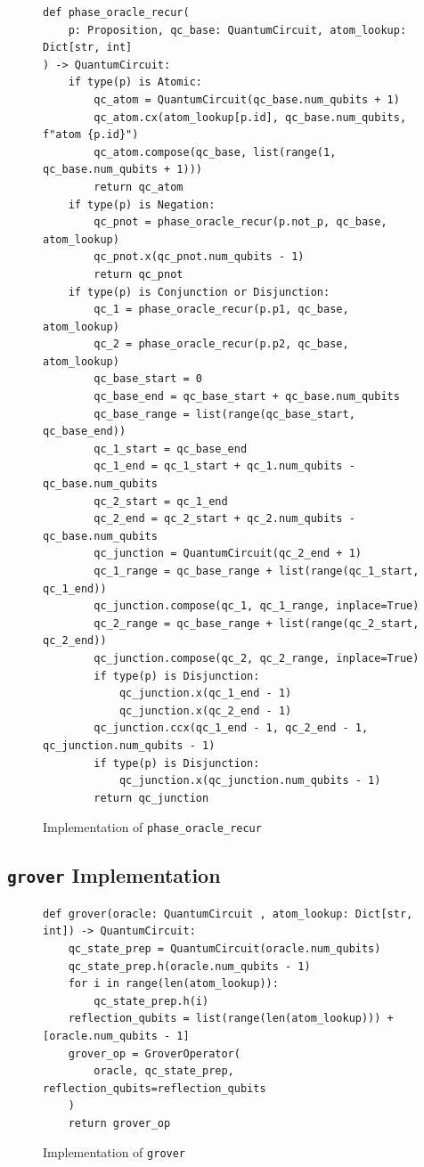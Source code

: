 \begin{figure}[H]
\centering
\begin{verbatim}
def phase_oracle_recur(
    p: Proposition, qc_base: QuantumCircuit, atom_lookup: Dict[str, int]
) -> QuantumCircuit:
    if type(p) is Atomic:
        qc_atom = QuantumCircuit(qc_base.num_qubits + 1)
        qc_atom.cx(atom_lookup[p.id], qc_base.num_qubits, f"atom {p.id}")
        qc_atom.compose(qc_base, list(range(1, qc_base.num_qubits + 1)))
        return qc_atom
    if type(p) is Negation:
        qc_pnot = phase_oracle_recur(p.not_p, qc_base, atom_lookup)
        qc_pnot.x(qc_pnot.num_qubits - 1)
        return qc_pnot
    if type(p) is Conjunction or Disjunction:
        qc_1 = phase_oracle_recur(p.p1, qc_base, atom_lookup)
        qc_2 = phase_oracle_recur(p.p2, qc_base, atom_lookup)
        qc_base_start = 0
        qc_base_end = qc_base_start + qc_base.num_qubits
        qc_base_range = list(range(qc_base_start, qc_base_end))
        qc_1_start = qc_base_end
        qc_1_end = qc_1_start + qc_1.num_qubits - qc_base.num_qubits
        qc_2_start = qc_1_end
        qc_2_end = qc_2_start + qc_2.num_qubits - qc_base.num_qubits
        qc_junction = QuantumCircuit(qc_2_end + 1)
        qc_1_range = qc_base_range + list(range(qc_1_start, qc_1_end))
        qc_junction.compose(qc_1, qc_1_range, inplace=True)
        qc_2_range = qc_base_range + list(range(qc_2_start, qc_2_end))
        qc_junction.compose(qc_2, qc_2_range, inplace=True)
        if type(p) is Disjunction:
            qc_junction.x(qc_1_end - 1)
            qc_junction.x(qc_2_end - 1)
        qc_junction.ccx(qc_1_end - 1, qc_2_end - 1, qc_junction.num_qubits - 1)
        if type(p) is Disjunction:
            qc_junction.x(qc_junction.num_qubits - 1)
        return qc_junction
\end{verbatim}
\caption{Implementation of \texttt{phase\_oracle\_recur} }
\label{fig:phase_oracle_recur}
\end{figure}

\subsection{\texttt{grover} Implementation}\label{subsec:grover-implementation}

\begin{figure}

\end{figure}

\begin{figure}
\centering
\begin{verbatim}
def grover(oracle: QuantumCircuit , atom_lookup: Dict[str, int]) -> QuantumCircuit:
    qc_state_prep = QuantumCircuit(oracle.num_qubits)
    qc_state_prep.h(oracle.num_qubits - 1)
    for i in range(len(atom_lookup)):
        qc_state_prep.h(i)
    reflection_qubits = list(range(len(atom_lookup))) + [oracle.num_qubits - 1]
    grover_op = GroverOperator(
        oracle, qc_state_prep, reflection_qubits=reflection_qubits
    )
    return grover_op
\end{verbatim}
\caption{Implementation of \texttt{grover} }
\label{fig:grover}
\end{figure}

